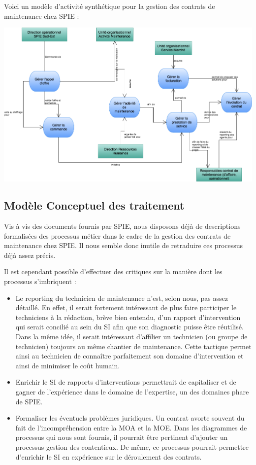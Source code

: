 Voici un modèle d'activité synthétique pour la gestion des contrats de maintenance chez SPIE :

\begin {center}
\includegraphics[width=\textwidth]{png_generaux/DiagrammeModeleActivite.png}
\end {center}

\subsection{Modèle Conceptuel des traitement} 
Vis à vis des documents fournis par SPIE, nous disposons déjà de descriptions formalisées des processus métier dans le cadre de la gestion des contrats de maintenance chez SPIE. Il nous semble donc inutile de retraduire ces processus déjà assez précis.

Il est cependant possible d'effectuer des critiques sur la manière dont les processus s'imbriquent :

\begin{itemize}
\item Le reporting du technicien de maintenance n'est, selon nous, pas assez détaillé. En effet, il serait fortement intéressant de plus faire participer le techniciens à la rédaction, brève bien entendu, d'un rapport d'intervention qui serait concilié au sein du SI afin que son diagnostic puisse être réutilisé. Dans la même idée, il serait intéressant d'affilier un technicien (ou groupe de technicien) toujours au même chantier de maintenance. Cette tactique permet ainsi au technicien de connaître parfaitement son domaine d'intervention et ainsi de minimiser le coût humain.
\item Enrichir le SI de rapports d'interventions permettrait de capitaliser et de gagner de l'expérience dans le domaine de l'expertise, un des domaines phare de SPIE.
\item Formaliser les éventuels problèmes juridiques. Un contrat avorte souvent du fait de l'incompréhension entre la MOA et la MOE. Dans les diagrammes de processus qui nous sont fournis, il pourrait être pertinent d'ajouter un processus gestion des contentieux. De même, ce processus pourrait permettre d'enrichir le SI en expérience sur le déroulement des contrats.
\end{itemize}


